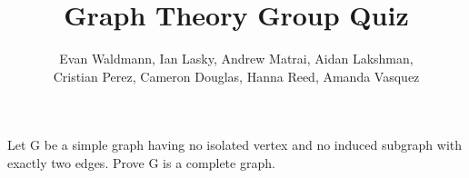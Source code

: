 \documentclass[10pt]{article}
\newenvironment{problem}[2][Problem]{\begin{trivlist}
		\item[\hskip \labelsep {\bfseries #1}\hskip \labelsep {\bfseries #2.}]}{\end{trivlist}}
\begin{document}
	
	\setlength{\topmargin}{0in}
	
	\setlength{\droptitle}{-10em} 
	\title{Graph Theory Group Quiz} 
	\author{Evan Waldmann, Ian Lasky, Andrew Matrai, Aidan Lakshman, \\
    Cristian Perez, Cameron Douglas, Hanna Reed, Amanda Vasquez} %
	\maketitle
	
	
	\begin{problem}{1}
		Let G be a simple graph having no isolated vertex and no induced subgraph with exactly two edges. Prove G is a complete graph. 
	\end{problem}
	
\end{document}
